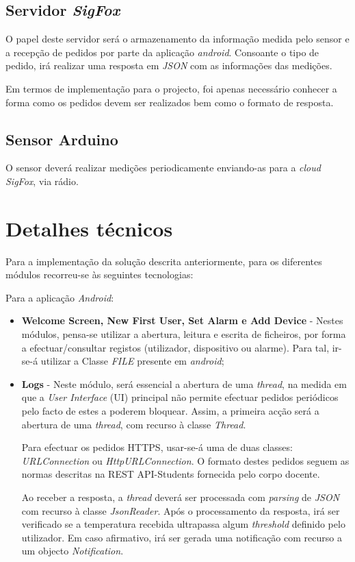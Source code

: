 \documentclass[a4paper]{article}
\begin{document}
\subsection{Servidor \textit{SigFox}}

O papel deste servidor será o armazenamento da informação medida pelo sensor e a recepção de pedidos por parte da aplicação \textit{android}. Consoante o tipo de pedido, irá realizar uma resposta em \textit{JSON} com as informações das medições.

Em termos de implementação para o projecto, foi apenas necessário conhecer a forma como os pedidos devem ser realizados bem como o formato de resposta.

\subsection{Sensor Arduino}

O sensor deverá realizar medições periodicamente enviando-as para a \textit{cloud SigFox}, via rádio.

\section{Detalhes técnicos}

Para a implementação da solução descrita anteriormente, para os diferentes módulos recorreu-se às seguintes tecnologias:

Para a aplicação \textit{Android}:
\begin{itemize}
\item \textbf{Welcome Screen, New First User, Set Alarm e Add Device} - Nestes módulos, pensa-se utilizar a abertura, leitura e escrita de ficheiros, por forma a efectuar/consultar registos (utilizador, dispositivo ou alarme). Para tal, ir-se-á utilizar a Classe \textit{FILE} presente em \textit{android};

\item \textbf{Logs} - Neste módulo, será essencial a abertura de uma \textit{thread}, na medida em que a \textit{User Interface} (UI) principal não permite efectuar pedidos periódicos pelo facto de estes a poderem bloquear. Assim, a primeira acção será a abertura de uma \textit{thread}, com recurso à classe \textit{Thread}. 

Para efectuar os pedidos HTTPS, usar-se-á uma de duas classes: \textit{URLConnection} ou \textit{HttpURLConnection}. O formato destes pedidos seguem as normas descritas na REST API-Students fornecida pelo corpo docente.

Ao receber a resposta, a \textit{thread} deverá ser processada com \textit{parsing} de \textit{JSON} com recurso à classe \textit{JsonReader}. Após o processamento da resposta, irá ser verificado se a temperatura recebida ultrapassa algum \textit{threshold} definido pelo utilizador. Em caso afirmativo, irá ser gerada uma notificação com recurso a um objecto \textit{Notification}.
\end{itemize}
\end{document}
